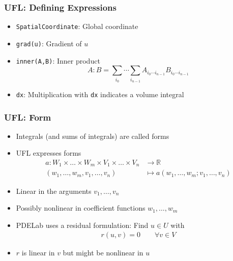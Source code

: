 \documentclass[aspectratio=169,11pt]{beamer}
\theoremstyle{definition}
\begin{document}
\begin{frame}
  \frametitle{UFL: Defining Expressions}
  
  \vfill
  \begin{itemize}
  \item \lstinline{SpatialCoordinate}: Global coordinate
  \item \lstinline{grad(u)}: Gradient of $u$
  \item \lstinline{inner(A,B)}: Inner product
    \begin{equation*}
      A:B = \sum_{i_0}\cdots\sum_{i_{n-1}}A_{i_0\cdots i_{n-1}}B_{i_0\cdots i_{n-1}}
    \end{equation*}
  \item \lstinline{dx}: Multiplication with \lstinline{dx} indicates a volume
    integral
  \end{itemize}
\end{frame}

\begin{frame}
  \frametitle{UFL: Form}
  \begin{itemize}
  \item Integrals (and sums of integrals) are called forms
  \item UFL expresses forms
    \begin{align*}
      a: W_1\times\dots\times W_m\times V_1\times\dots\times V_n & \rightarrow \mathbb{R} \\
      (w_1,\dots ,w_m,v_1,\dots ,v_n) & \mapsto a(w_1,\dots ,w_m;v_1,\dots ,v_n)
    \end{align*}
  \item Linear in the arguments $v_1,\dots,v_n$
  \item Possibly nonlinear in coefficient functions $w_1,\dots,w_m$
  \item PDELab uses a residual formulation: Find $u\in U$ with
    \begin{align*}
      r(u,v) = 0 \qquad \forall v \in V
    \end{align*}
  \item $r$ is linear in $v$ but might be nonlinear in $u$
  \end{itemize}
\end{frame}
\end{document}
